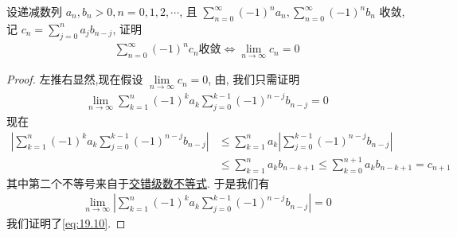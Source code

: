 \documentclass[../../main.tex]{subfiles}
\begin{document}
\begin{example}
设递减数列 $a_n, b_n > 0, n = 0, 1, 2, \cdots$, 且 $\sum\limits_{n=0}^{\infty} (-1)^n a_n, \sum\limits_{n=0}^{\infty} (-1)^n b_n$ 收敛, 记 $c_n = \sum\limits_{j=0}^{n} a_j b_{n-j}$, 证明
\begin{align}
\sum\limits_{n=0}^{\infty} (-1)^n c_n \text{收敛} \iff \lim\limits_{n\to\infty} c_n = 0
\label{eq:19.10}
\end{align}
\end{example}
\begin{proof}
左推右显然,现在假设 $\lim\limits_{n\to\infty} c_n = 0$, 由, 我们只需证明
\begin{align*}
\lim\limits_{n\to\infty} \sum\limits_{k=1}^{n} (-1)^k a_k \sum\limits_{j=0}^{k-1} (-1)^{n-j} b_{n-j} = 0
\end{align*}
现在
\begin{align*}
\left| \sum\limits_{k=1}^{n} (-1)^k a_k \sum\limits_{j=0}^{k-1} (-1)^{n-j} b_{n-j} \right| &\leqslant \sum\limits_{k=1}^{n} a_k \left| \sum\limits_{j=0}^{k-1} (-1)^{n-j} b_{n-j} \right| \\
&\leqslant \sum\limits_{k=1}^{n} a_k b_{n - k + 1} \leqslant \sum\limits_{k=0}^{n+1} a_k b_{n - k + 1} = c_{n+1}
\end{align*}
其中第二个不等号来自于\hyperref[theorem:交错级数不等式]{交错级数不等式}. 于是我们有
\begin{align*}
\lim\limits_{n\to\infty} \left| \sum\limits_{k=1}^{n} (-1)^k a_k \sum\limits_{j=0}^{k-1} (-1)^{n-j} b_{n-j} \right| = 0
\end{align*}
我们证明了\eqref{eq:19.10}.
\end{proof}
\end{document}
